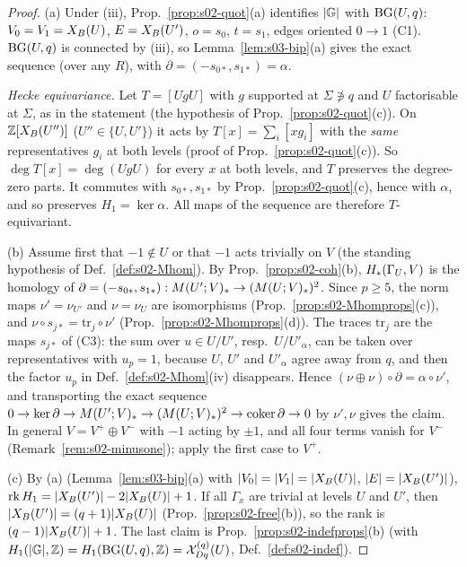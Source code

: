 \begin{proof}
(a) Under (iii), Prop.~\ref{prop:s02-quot}(a) identifies $|\mathbb{G}|$ with $\mathrm{BG}(U,q)$: $V_0=V_1=X_B(U)$, $E=X_B(U')$, $o=s_0$, $t=s_1$, edges oriented
$0\to1$ (C1). $\mathrm{BG}(U,q)$ is connected by (iii), so Lemma~\ref{lem:s03-bip}(a) gives the exact sequence (over any $R$), with
$\partial=(-s_{0*},s_{1*})=\alpha$.

\emph{Hecke equivariance.} Let $T=[UgU]$ with $g$ supported at $\Sigma\not\ni q$ and $U$ factorisable at $\Sigma$, as in the statement
(the hypothesis of Prop.~\ref{prop:s02-quot}(c)). On $\mathbb{Z}[X_B(U'')]$ ($U''\in\{U,U'\}$) it acts by $T[x]=\sum_i[xg_i]$ with the \emph{same} representatives $g_i$ at both
levels (proof of Prop.~\ref{prop:s02-quot}(c)). So $\deg T[x]=\deg(UgU)$ for every $x$ at both levels, and $T$ preserves the degree-zero parts. It
commutes with $s_{0*},s_{1*}$ by Prop.~\ref{prop:s02-quot}(c), hence with $\alpha$, and so preserves $H_1=\ker\alpha$. All maps of the sequence are
therefore $T$-equivariant.

(b) Assume first that $-1\notin U$ or that $-1$ acts trivially on $V$ (the standing hypothesis of Def.~\ref{def:s02-Mhom}). By
Prop.~\ref{prop:s02-coh}(b), $H_*(\Gamma_U,V)$ is the homology of $\partial=(-s_{0*},s_{1*}):M(U';V)_*\to(M(U;V)_*)^2$. Since $p\ge5$, the norm
maps $\nu'=\nu_{U'}$ and $\nu=\nu_U$ are isomorphisms (Prop.~\ref{prop:s02-Mhomprops}(c)), and $\nu\circ s_{j*}=\mathrm{tr}_j\circ\nu'$
(Prop.~\ref{prop:s02-Mhomprops}(d)). The traces $\mathrm{tr}_j$ are the maps $s_{j*}$ of (C3): the sum over $u\in U/U'$, resp.\ $U/U'_\alpha$, can be
taken over representatives with $u_p=1$, because $U$, $U'$ and $U'_\alpha$ agree away from $q$, and then the factor $u_p$ in Def.~\ref{def:s02-Mhom}(iv)
disappears. Hence $(\nu\oplus\nu)\circ\partial=\alpha\circ\nu'$, and transporting the exact sequence
$0\to\ker\partial\to M(U';V)_*\to(M(U;V)_*)^2\to\operatorname{coker}\partial\to0$ by $\nu',\nu$ gives the claim. In general $V=V^+\oplus V^-$ with $-1$
acting by $\pm1$, and all four terms vanish for $V^-$ (Remark~\ref{rem:s02-minusone}); apply the first case to $V^+$.

(c) By (a) (Lemma~\ref{lem:s03-bip}(a) with $|V_0|=|V_1|=|X_B(U)|$, $|E|=|X_B(U')|$), $\operatorname{rk} H_1=|X_B(U')|-2|X_B(U)|+1$. If all $\Gamma_x$ are trivial at levels $U$
and $U'$, then $|X_B(U')|=(q+1)|X_B(U)|$ (Prop.~\ref{prop:s02-free}(b)), so the rank is $(q-1)|X_B(U)|+1$. The last claim is
Prop.~\ref{prop:s02-indefprops}(b) (with $H_1(|\mathbb{G}|,\mathbb{Z})=H_1(\mathrm{BG}(U,q),\mathbb{Z})=\mathcal{X}^{(q)}_{Dq}(U)$, Def.~\ref{def:s02-indef}).
\end{proof}


